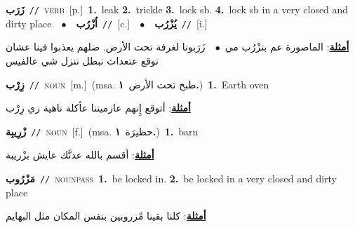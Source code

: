 \documentclass[10pt,a4paper,twoside]{article} %
\begin{document}
\begin{multicols}{2}
{\setlength\topsep{0pt}\textbf{\foreignlanguage{arabic}{زَرَب}}\ {\color{gray}\texttt{//}\color{black}}\ \textsc{verb}\ [p.]\ \textbf{1.}~leak  \textbf{2.}~trickle  \textbf{3.}~lock sb.  \textbf{4.}~lock sb in a very closed and dirty place\ \ $\bullet$\ \ \setlength\topsep{0pt}\textbf{\foreignlanguage{arabic}{اُزْرُب}}\ {\color{gray}\texttt{//}\color{black}}\ [c.]\ \ $\bullet$\ \ \setlength\topsep{0pt}\textbf{\foreignlanguage{arabic}{يُزْرُب}}\ {\color{gray}\texttt{//}\color{black}}\ [i.]\  \begin{flushright}\color{gray}\foreignlanguage{arabic}{\textbf{\underline{\foreignlanguage{arabic}{أمثلة}}}: الماصورة عم بتزْرُب مي\ $\bullet$\ \  زَرَبونا لغرفة تحت الأرض. ضلهم يعذبوا فينا عشان نوقع عتعدات نبطل ننزل شي عالفيس}\end{flushright}\color{black}} \vspace{2mm}

{\setlength\topsep{0pt}\textbf{\foreignlanguage{arabic}{زِرْب}}\ {\color{gray}\texttt{//}\color{black}}\ \textsc{noun}\ [m.]\ \color{gray}(msa. \foreignlanguage{arabic}{طبخ تحت الأرض}~\foreignlanguage{arabic}{\textbf{١.}})\color{black}\ \textbf{1.}~Earth oven\  \begin{flushright}\color{gray}\foreignlanguage{arabic}{\textbf{\underline{\foreignlanguage{arabic}{أمثلة}}}: أتوقع إِنهم عازميننا عأكلة ناهية زي زِرْب}\end{flushright}\color{black}} \vspace{2mm}

{\setlength\topsep{0pt}\textbf{\foreignlanguage{arabic}{زْرِيبِة}}\ {\color{gray}\texttt{//}\color{black}}\ \textsc{noun}\ [f.]\ \color{gray}(msa. \foreignlanguage{arabic}{حظيرَة}~\foreignlanguage{arabic}{\textbf{١.}})\color{black}\ \textbf{1.}~barn\  \begin{flushright}\color{gray}\foreignlanguage{arabic}{\textbf{\underline{\foreignlanguage{arabic}{أمثلة}}}: أقسم بالله عدنَّك عايش بزْريبة}\end{flushright}\color{black}} \vspace{2mm}

{\setlength\topsep{0pt}\textbf{\foreignlanguage{arabic}{مَزْرُوب}}\ {\color{gray}\texttt{//}\color{black}}\ \textsc{noun\textunderscore pass}\ \textbf{1.}~be locked in.  \textbf{2.}~be locked in a very closed and dirty place\  \begin{flushright}\color{gray}\foreignlanguage{arabic}{\textbf{\underline{\foreignlanguage{arabic}{أمثلة}}}: كلنا بقينا مْزروبين بنفس المكان مثل البهايم}\end{flushright}\color{black}} \vspace{2mm}


\end{multicols}
\end{document}
